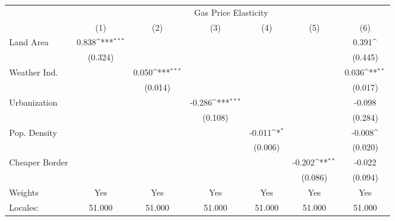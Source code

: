 {
\def\sym#1{\ifmmode^{#1}\else\(^{#1}\)\fi}
\begin{tabular}{l*{6}{c}}
\hline\hline
            &\multicolumn{6}{c}{Gas Price Elasticity}                                                                                           \\
            &\multicolumn{1}{c}{(1)}         &\multicolumn{1}{c}{(2)}         &\multicolumn{1}{c}{(3)}         &\multicolumn{1}{c}{(4)}         &\multicolumn{1}{c}{(5)}         &\multicolumn{1}{c}{(6)}         \\
\hline
Land Area   &       0.838\sym{***}&                     &                     &                     &                     &       0.391\sym{} \\
            &     (0.324)         &                     &                     &                     &                     &     (0.445)         \\
[1em]
Weather Ind.&                     &       0.050\sym{***}&                     &                     &                     &       0.036\sym{**}\\
            &                     &     (0.014)         &                     &                     &                     &     (0.017)         \\
[1em]
Urbanization&                     &                     &      -0.286\sym{***}&                     &                     &      -0.098         \\
            &                     &                     &     (0.108)         &                     &                     &     (0.284)         \\
[1em]
Pop. Density&                     &                     &                     &      -0.011\sym{*}&                     &      -0.008\sym{}\\
            &                     &                     &                     &     (0.006)         &                     &     (0.020)         \\
[1em]
Cheaper Border&                     &                     &                     &                     &      -0.202\sym{**} &      -0.022         \\
            &                     &                     &                     &                     &     (0.086)         &     (0.094)         \\
\hline
Weights     &         Yes         &         Yes         &         Yes         &         Yes         &         Yes         &         Yes         \\
Locales:    &      51.000         &      51.000         &      51.000         &      51.000         &      51.000         &      51.000         \\
\hline\hline
\end{tabular}
}
